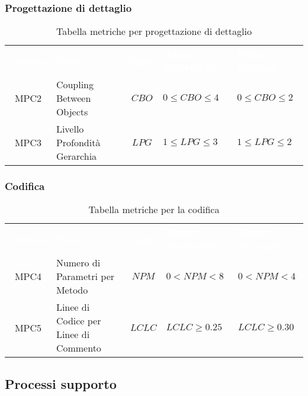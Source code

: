 \subsubsection{Progettazione di dettaglio}
\renewcommand{\arraystretch}{1.5}
\begin{longtable}{ c C{4cm} c C{3.5cm} C{3.5cm}}
	\caption{Tabella metriche per progettazione di dettaglio}\\
	\textcolor{white}{\textbf{Metrica}} & \textcolor{white}{\textbf{Nome}} & \textcolor{white}{\textbf{Sigla}} & \textcolor{white}{\textbf{Range Accettabile}} & \textcolor{white}{\textbf{Range Ottimale}}\\
    MPC2 & Coupling Between Objects & $CBO$ & $0 \leq CBO \leq 4$ & $0 \leq CBO \leq 2$ \\
    MPC3 & Livello Profondità Gerarchia & $LPG$ &  $1 \leq LPG \leq 3$ &  $1 \leq LPG \leq 2$ \\
\end{longtable}
\newpage
\subsubsection{Codifica}  
     \renewcommand{\arraystretch}{1.5}
     \begin{longtable}{ c C{4cm} c C{3.5cm} C{3.5cm}}
     	\caption{Tabella metriche per la codifica}\\
     	\textcolor{white}{\textbf{Metrica}} & \textcolor{white}{\textbf{Nome}} & \textcolor{white}{\textbf{Sigla}} & \textcolor{white}{\textbf{Range Accettabile}} & \textcolor{white}{\textbf{Range Ottimale}}\\
		MPC4 & Numero di Parametri per Metodo & $NPM$ & $0 < NPM < 8$ & $ 0 < NPM < 4$ \\
		MPC5 & Linee di Codice per Linee di Commento & $LCLC$ & $LCLC \geq 0.25$ & $LCLC \geq 0.30$ \\
	\end{longtable}
\vspace{0.3cm}
\subsection{Processi supporto}

